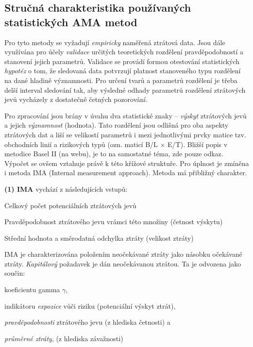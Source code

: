 \documentclass{article}
\begin{document}
\subsection{Stručná charakteristika používaných statistických AMA metod}


Pro tyto metody se vyžadují \emph{empiricky} naměřená ztrátová data. Jsou dále využívána pro účely \emph{validace} určitých teoretických rozdělení pravděpodobností a stanovení jejich parametrů. Validace se provádí formou otestování statistických \emph{hypotéz} o tom, že sledovaná data potvrzují platnost stanoveného typu rozdělení na dané hladině významnosti. Pro určení tvarů a parametrů rozdělení je třeba delší interval sledování  tak, aby výsledné odhady parametrů rozdělení ztrátových jevů vycházely z dostatečně četných pozorování.

Pro zpracování jsou brány v úvahu dva statistické znaky – \emph{výskyt} ztrátových jevů a jejich \emph{významnost} (hodnota). Tato rozdělení jsou odlišná pro oba aspekty ztrátových dat a liší se velikostí parametrů i mezi jednotlivými prvky matice tzv. obchodních linií a rizikových typů (ozn. maticí B/L $\times$ E/T). Bližší popis v metodice Basel II (na webu), je to na samostatné téma, zde pouze odkaz. Výpočet se ovšem vztahuje právě k této křížové struktuře. Pro úplnost je zmíněna i metoda IMA (Internal measurement approach). Metoda má přibližný charakter.

\textbf{(1) IMA} vychází z následujících vstupů:

\begin{compactitem}
    \item Celkový počet potenciálních ztrátových jevů
    \item Pravděpodobnost ztrátového jevu vrámci této množiny (četnost výskytu)
    \item Střední hodnota a směrodatná odchylka ztráty (velikost ztráty)
\end{compactitem}


IMA je charakterizována položením neočekávané ztráty jako násobku očekávané ztráty. \emph{Kapitálový} požadavek je dán neočekávanou ztrátou. Ta je odvozena jako součin:

\begin{compactitem}
    \item koeficientu gamma $\gamma$,
    \item indikátoru \emph{expozice} vůči riziku (potenciální výskyt ztrát),
    \item \emph{pravděpodobnosti} ztrátového jevu (z hlediska četnosti) a
    \item \emph{průměrné ztráty}, (z hlediska závažnosti)
\end{compactitem}
\end{document}

